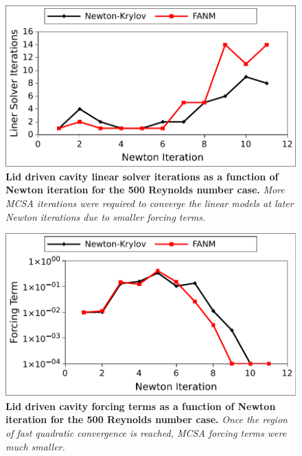 \begin{figure}[t!]
  \begin{center}
    \includegraphics[width=6in]{chapters/nonlinear_problem/driven_re500_iters.pdf}
  \end{center}
  \caption{\textbf{Lid driven cavity linear solver iterations as a
      function of Newton iteration for the 500 Reynolds number case.}
    \textit{More MCSA iterations were required to converge the linear
      models at later Newton iterations due to smaller forcing
      terms.}}
  \label{fig:driven_re500_iters}
\end{figure}

\begin{figure}[t!]
  \begin{center}
    \includegraphics[width=6in]{chapters/nonlinear_problem/driven_re500_forcing.pdf}
  \end{center}
  \caption{\textbf{Lid driven cavity forcing terms as a function of
      Newton iteration for the 500 Reynolds number case.} \textit{Once
      the region of fast quadratic convergence is reached, MCSA
      forcing terms were much smaller.}}
  \label{fig:driven_re500_forcing}
\end{figure}

